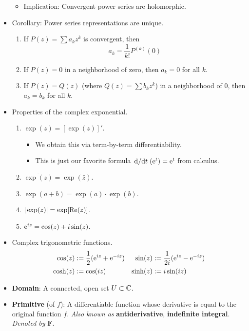 \documentclass[../notes.tex]{subfiles}
\begin{document}
\begin{itemize}
    \begin{itemize}
        \item Implication: Convergent power series are holomorphic.
    \end{itemize}
    \item Corollary: Power series representations are unique.
    \begin{enumerate}
        \item If $P(z)=\sum a_kz^k$ is convergent, then
        \begin{equation*}
            a_k = \frac{1}{k!}P^{(k)}(0)
        \end{equation*}
        \item If $P(z)=0$ in a neighborhood of zero, then $a_k=0$ for all $k$.
        \item If $P(z)=Q(z)$ (where $Q(z)=\sum b_kz^k$) in a neighborhood of 0, then $a_k=b_k$ for all $k$.
    \end{enumerate}
    \item Properties of the complex exponential.
    \begin{enumerate}
        \item $\exp(z)=[\exp(z)]'$.
        \begin{itemize}
            \item We obtain this via term-by-term differentiability.
            \item This is just our favorite formula $\dv*{t}(\e[t])=\e[t]$ from calculus.
        \end{itemize}
        \item $\overline{\exp(z)}=\exp(\bar{z})$.
        \item $\exp(a+b)=\exp(a)\cdot\exp(b)$.
        \item $|\exp(z)|=\exp[\re(z)]$.
        \item $\e[iz] = \cos(z)+i\sin(z)$.
    \end{enumerate}
    \item Complex trigonometric functions.
    \begin{align*}
        \cos(z) &:= \frac{1}{2}(\e[iz]+\e[-iz])&
        \sin(z) &:= \frac{1}{2i}(\e[iz]-\e[-iz])\\
        \cosh(z) &:= \cos(iz)&
        \sinh(z) &:= i\sin(iz)
    \end{align*}
    \item \textbf{Domain}: A connected, open set $U\subset\C$.
    \item \textbf{Primitive} (of $f$): A differentiable function whose derivative is equal to the original function $f$. \emph{Also known as} \textbf{antiderivative}, \textbf{indefinite integral}. \emph{Denoted by} $\bm{F}$.

\end{itemize}
\end{document}
